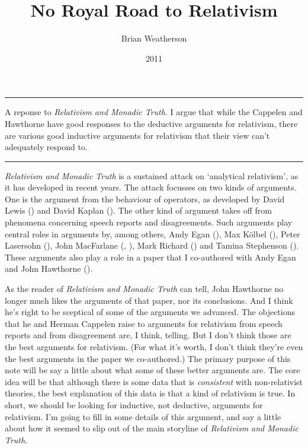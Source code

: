 \documentclass[
  10pt,
  letterpaper,
  DIV=11,
  numbers=noendperiod,
  twoside]{scrartcl}
\title{No Royal Road to Relativism}
\author{Brian Weatherson}
\date{2011}
\renewenvironment{abstract}
 {\vspace{-1.25cm}
 \quotation\small\noindent\rule{\linewidth}{.5pt}\par\smallskip
 \noindent }
 {\par\noindent\rule{\linewidth}{.5pt}\endquotation}
\begin{document}
\maketitle
\begin{abstract}
A reponse to \emph{Relativism and Monadic Truth}. I argue that while the
Cappelen and Hawthorne have good responses to the deductive arguments
for relativism, there are various good inductive arguments for
relativism that their view can't adequately respond to.
\end{abstract}

\emph{Relativism and Monadic Truth} is a sustained attack on `analytical
relativism', as it has developed in recent years. The attack focusses on
two kinds of arguments. One is the argument from the behaviour of
operators, as developed by David Lewis ()
and David Kaplan (). The other kind
of argument takes off from phenomena concerning speech reports and
disagreements. Such arguments play central roles in arguments by, among
others, Andy Egan (), Max Kölbel
(), Peter Lasersohn
(), John MacFarlane
(,
), Mark Richard
() and Tamina Stephenson
(). These arguments also play
a role in a paper that I co-authored with Andy Egan and John Hawthorne
().

As the reader of \emph{Relativism and Monadic Truth} can tell, John
Hawthorne no longer much likes the arguments of that paper, nor its
conclusions. And I think he's right to be sceptical of some of the
arguments we advanced. The objections that he and Herman Cappelen raise
to arguments for relativism from speech reports and from disagreement
are, I think, telling. But I don't think those are the best arguments
for relativism. (For what it's worth, I don't think they're even the
best arguments in the paper we co-authored.) The primary purpose of this
note will be say a little about what some of these better arguments are.
The core idea will be that although there is some data that is
\emph{consistent} with non-relativist theories, the best explanation of
this data is that a kind of relativism is true. In short, we should be
looking for inductive, not deductive, arguments for relativism. I'm
going to fill in some details of this argument, and say a little about
how it seemed to slip out of the main storyline of \emph{Relativism and
Monadic Truth}.
\end{document}
